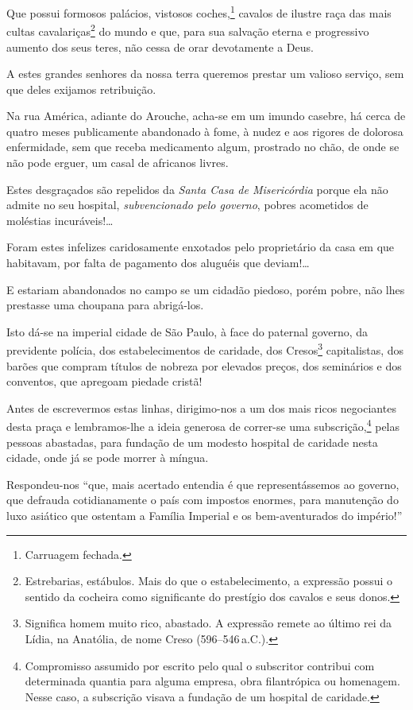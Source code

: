 Que possui formosos palácios, vistosos coches,\footnote{Carruagem
  fechada.} cavalos de ilustre raça das mais cultas
cavalariças\footnote{Estrebarias, estábulos. Mais do que o
  estabelecimento, a expressão possui o sentido da cocheira como
  significante do prestígio dos cavalos e seus donos.} do mundo e que,
para sua salvação eterna e progressivo aumento dos seus teres, não cessa
de orar devotamente a Deus.

A estes grandes senhores da nossa terra queremos prestar um valioso
serviço, sem que deles exijamos retribuição.

Na rua América, adiante do Arouche, acha-se em um imundo casebre, há
cerca de quatro meses publicamente abandonado à fome, à nudez e aos
rigores de dolorosa enfermidade, sem que receba medicamento algum,
prostrado no chão, de onde se não pode erguer, um casal de africanos
livres.

Estes desgraçados são repelidos da \textit{Santa Casa de Misericórdia} porque ela
não admite no seu hospital, \emph{subvencionado pelo governo}, pobres
acometidos de moléstias incuráveis!\ldots{}

Foram estes infelizes caridosamente enxotados pelo proprietário da casa
em que habitavam, por falta de pagamento dos aluguéis que
deviam!\ldots{}

E estariam abandonados no campo se um cidadão piedoso, porém pobre, não
lhes prestasse uma choupana para abrigá-los.

Isto dá-se na imperial cidade de São Paulo, à face do paternal governo,
da previdente polícia, dos estabelecimentos de caridade, dos
Cresos\footnote{Significa homem muito rico, abastado. A expressão
  remete ao último rei da Lídia, na Anatólia, de nome Creso (596--546\,a.C.).} 
  capitalistas, dos barões que compram títulos de nobreza por
elevados preços, dos seminários e dos conventos, que apregoam piedade
cristã!

Antes de escrevermos estas linhas, dirigimo-nos a um dos mais ricos
negociantes desta praça e lembramos-lhe a ideia generosa de correr-se
uma subscrição,\footnote{Compromisso assumido por escrito pelo qual o
  subscritor contribui com determinada quantia para alguma empresa, obra
  filantrópica ou homenagem. Nesse caso, a subscrição visava a fundação
  de um hospital de caridade.} pelas pessoas abastadas, para fundação
de um modesto hospital de caridade nesta cidade, onde já se pode morrer
à míngua.

Respondeu-nos ``que, mais acertado entendia é que representássemos ao
governo, que defrauda cotidianamente o país com impostos enormes, para
manutenção do luxo asiático que ostentam a Família Imperial e os
bem-aventurados do império!''

